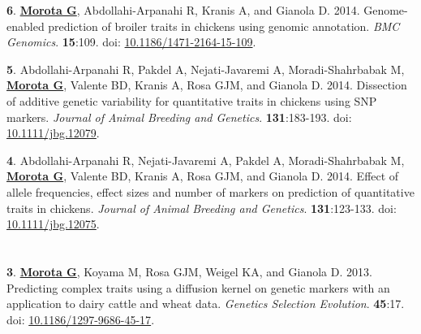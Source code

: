 \documentclass[margin,line,10pt]{res}
\newenvironment{list1}{
  \begin{list}{\ding{113}}{%
      \setlength{\itemsep}{0in}
      \setlength{\parsep}{0in} \setlength{\parskip}{0in}
      \setlength{\topsep}{0in} \setlength{\partopsep}{0in} 
      \setlength{\leftmargin}{0.17in}}}{\end{list}}
\begin{document}
\begin{resume}
\begin{list1}
\vspace{0.5cm}

\item [{\bf 6}.]  {\bf \underline{Morota G}}, Abdollahi-Arpanahi R, Kranis A, and Gianola D. 2014.   
     Genome-enabled prediction of broiler traits in chickens using genomic annotation. \emph{BMC Genomics}. {\bf 15}:109. doi: \textcolor{blue}{\href{http://dx.doi.org/10.1186/1471-2164-15-109}{10.1186/1471-2164-15-109}}. 
    

\vspace{0.5cm}

\item [{\bf 5}.]  Abdollahi-Arpanahi R, Pakdel A, Nejati-Javaremi A, Moradi-Shahrbabak M, 
     {\bf \underline{Morota G}}, Valente BD, Kranis A, Rosa GJM, and Gianola D. 2014.
     Dissection of additive genetic variability for quantitative traits in chickens using SNP markers. \emph{Journal of Animal Breeding and Genetics}. \textbf{131}:183-193. doi: \textcolor{blue}{\href{http://dx.doi.org/10.1111/jbg.12079}{10.1111/jbg.12079}}. 

\vspace{0.5cm}

\item [{\bf 4}.]  Abdollahi-Arpanahi R,  Nejati-Javaremi A,  Pakdel A, Moradi-Shahrbabak M, 
     {\bf \underline{Morota G}}, Valente BD, Kranis A, Rosa GJM, and Gianola D. 2014.   
     Effect of allele frequencies, effect sizes and number of markers on prediction of quantitative 
     traits in chickens. \emph{Journal of Animal Breeding and Genetics}. \textbf{131}:123-133. doi: \textcolor{blue}{\href{http://dx.doi.org/10.1111/jbg.12075}{10.1111/jbg.12075}}. 
\end{list1}



\section{}


\begin{list1}
\item [{\bf 3}.]  {\bf \underline{Morota G}}, Koyama M, Rosa GJM, Weigel KA, and Gianola D. 2013.
     Predicting complex traits using a diffusion kernel on genetic markers with an application to dairy cattle and wheat data. \emph{Genetics Selection Evolution}. {\bf 45}:17. doi: \textcolor{blue}{\href{http://dx.doi.org/10.1186/1297-9686-45-17}{10.1186/1297-9686-45-17}}.  

\vspace{0.5cm}


\end{list1}
\end{resume}
\end{document}
